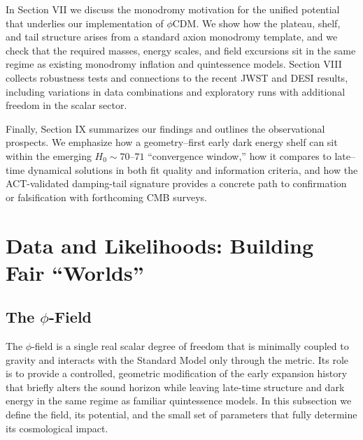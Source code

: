 \documentclass[a4paper,11pt]{article}
\begin{document}
In Section VII we discuss the monodromy motivation for the unified potential that underlies our implementation of $\phi$CDM. We show how the plateau, shelf, and tail structure arises from a standard axion monodromy template, and we check that the required masses, energy scales, and field excursions sit in the same regime as existing monodromy inflation and quintessence models. Section VIII collects robustness tests and connections to the recent JWST and DESI results, including variations in data combinations and exploratory runs with additional freedom in the scalar sector.

Finally, Section IX summarizes our findings and outlines the observational prospects. We emphasize how a geometry--first early dark energy shelf can sit within the emerging $H_0 \sim 70$--$71$ ``convergence window,'' how it compares to late--time dynamical solutions in both fit quality and information criteria, and how the ACT-validated damping-tail signature provides a concrete path to confirmation or falsification with forthcoming CMB surveys.


\section{Data and Likelihoods: Building Fair ``Worlds''}


\subsection{The $\phi$-Field}
\label{sec:phi_field}

The $\phi$-field is a single real scalar degree of freedom that is minimally coupled to gravity and interacts with the Standard Model only through the metric. Its role is to provide a controlled, geometric modification of the early expansion history that briefly alters the sound horizon while leaving late-time structure and dark energy in the same regime as familiar quintessence models. In this subsection we define the field, its potential, and the small set of parameters that fully determine its cosmological impact.
\end{document}
